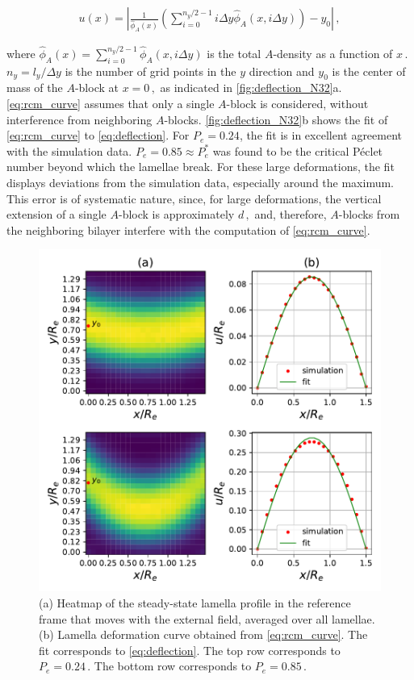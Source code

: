 \documentclass[bachelor,       %
               oneside,        %
               BCOR10mm,       %
               ngerman, english %
               ]{GAUBM}
\begin{document}
\begin{align}
    u(x)=\left |\frac{1}{\hat\phi_A(x)}\left(\sum_{i=0}^{n_y/2-1}i\Delta y \hat\phi_A(x,i\Delta y)\right)-y_0\right |\,,
    \label{eq:rcm_curve}
\end{align}

where $\hat\phi_A(x)=\sum_{i=0}^{n_y/2-1}\hat\phi_A(x,i\Delta y)$ is the total $A$-density as a function of $x\,.$ $n_y=l_y/\Delta y$ is the number of grid points in the $y$ direction and $y_0$ is the center of mass of the $A$-block at $x=0\,,$ as indicated in \autoref{fig:deflection_N32}a. \autoref{eq:rcm_curve} assumes that only a single $A$-block is considered, without interference from neighboring $A$-blocks. \autoref{fig:deflection_N32}b shows the fit of \autoref{eq:rcm_curve} to \autoref{eq:deflection}. For $P_e=0.24$, the fit is in excellent agreement with the simulation data. $P_e=0.85\approx P_e^*$ was found to be the critical P\'eclet number beyond which the lamellae break. For these large deformations, the fit displays deviations from the simulation data, especially around the maximum. This error is of systematic nature, since, for large deformations, the vertical extension of a single $A$-block is approximately $d\,,$ and, therefore, $A$-blocks from the neighboring bilayer interfere with the computation of \autoref{eq:rcm_curve}. 

\begin{figure}[H]
    \centering
    \includegraphics[width=\linewidth]{Thesis/figures/deflection_N32.pdf}
    \caption{(a) Heatmap of the steady-state lamella profile in the reference frame that moves with the external field, averaged over all lamellae. (b) Lamella deformation curve obtained from \autoref{eq:rcm_curve}. The fit corresponds to \autoref{eq:deflection}. The top row corresponds to $P_e=0.24\,.$ The bottom row corresponds to $P_e=0.85\,.$}
    \label{fig:deflection_N32}
\end{figure}
\end{document}
